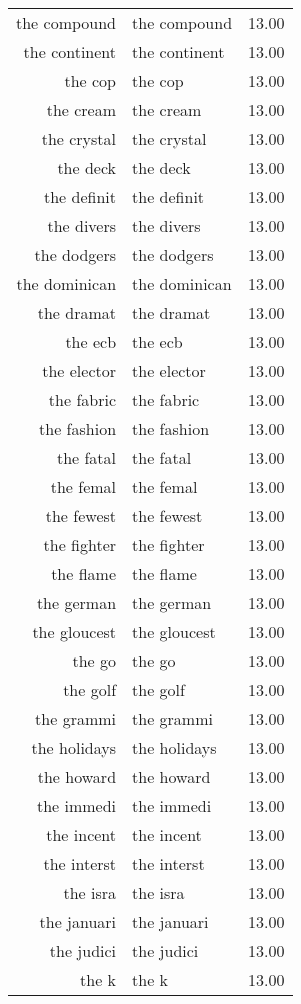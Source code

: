 \begin{table}[ht]
\begin{tabular}{rlr}
  the compound & the compound & 13.00 \\ 
  the continent & the continent & 13.00 \\ 
  the cop & the cop & 13.00 \\ 
  the cream & the cream & 13.00 \\ 
  the crystal & the crystal & 13.00 \\ 
  the deck & the deck & 13.00 \\ 
  the definit & the definit & 13.00 \\ 
  the divers & the divers & 13.00 \\ 
  the dodgers & the dodgers & 13.00 \\ 
  the dominican & the dominican & 13.00 \\ 
  the dramat & the dramat & 13.00 \\ 
  the ecb & the ecb & 13.00 \\ 
  the elector & the elector & 13.00 \\ 
  the fabric & the fabric & 13.00 \\ 
  the fashion & the fashion & 13.00 \\ 
  the fatal & the fatal & 13.00 \\ 
  the femal & the femal & 13.00 \\ 
  the fewest & the fewest & 13.00 \\ 
  the fighter & the fighter & 13.00 \\ 
  the flame & the flame & 13.00 \\ 
  the german & the german & 13.00 \\ 
  the gloucest & the gloucest & 13.00 \\ 
  the go & the go & 13.00 \\ 
  the golf & the golf & 13.00 \\ 
  the grammi & the grammi & 13.00 \\ 
  the holidays & the holidays & 13.00 \\ 
  the howard & the howard & 13.00 \\ 
  the immedi & the immedi & 13.00 \\ 
  the incent & the incent & 13.00 \\ 
  the interst & the interst & 13.00 \\ 
  the isra & the isra & 13.00 \\ 
  the januari & the januari & 13.00 \\ 
  the judici & the judici & 13.00 \\ 
  the k & the k & 13.00 \\ 

\end{tabular}
\end{table}
